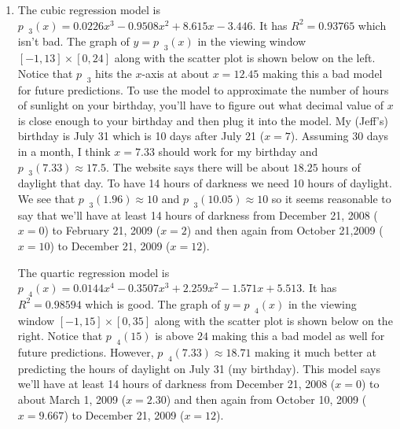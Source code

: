\documentclass{ximera}
\begin{document}
\begin{enumerate}
\setcounter{enumi}{\value{HW}}


\item The cubic regression model is $p_{\mbox{ $3$}}(x) = 0.0226x^{3} - 0.9508x^{2} + 8.615x - 3.446$.  It has $R^{2} = 0.93765$ which isn't bad.  The graph of $y = p_{\mbox{ $3$}}(x)$ in the viewing window $[-1,13] \times [0, 24]$ along with the scatter plot is shown below on the left.  Notice that $p_{\mbox{ $3$}}$ hits the $x$-axis at about $x = 12.45$ making this a bad model for future predictions.  To use the model to approximate the number of hours of sunlight on your birthday, you'll have to figure out what decimal value of $x$ is close enough to your birthday and then plug it into the model.  My (Jeff's) birthday is July 31 which is 10 days after July 21 ($x = 7$).  Assuming 30 days in a month, I think $x = 7.33$ should work for my birthday and $p_{\mbox{ $3$}}(7.33) \approx 17.5$.  The website says there will be about $18.25$ hours of daylight that day.  To have 14 hours of darkness we need 10 hours of daylight.  We see that $p_{\mbox{ $3$}}(1.96) \approx 10$ and $p_{\mbox{ $3$}}(10.05) \approx 10$ so it seems reasonable to say that we'll have at least 14 hours of darkness from December 21, 2008 ($x = 0$) to February 21, 2009 ($x = 2$) and then again from October 21,2009 ($x = 10$) to December 21, 2009 ($x = 12$).

\smallskip

The quartic regression model is $p_{\mbox{ $4$}}(x) = 0.0144x^{4} - 0.3507x^{3} + 2.259x^{2} - 1.571x + 5.513$.  It has $R^{2} = 0.98594$ which is good.  The graph of $y = p_{\mbox{ $4$}}(x)$ in the viewing window $[-1, 15] \times [0, 35]$ along with the scatter plot is shown below on the right.  Notice that $p_{\mbox{ $4$}}(15)$ is above $24$ making this a bad model as well for future predictions.  However, $p_{\mbox{ $4$}}(7.33) \approx 18.71$ making it much better at predicting the hours of daylight on July 31 (my birthday).  This model says we'll have at least 14 hours of darkness from December 21, 2008 ($x = 0$) to about March 1, 2009 ($x = 2.30$) and then again from October 10, 2009 ($x = 9.667$) to December 21, 2009 ($x = 12$).

\begin{center}

\begin{tabular}{cc}



\end{tabular}
\end{center}
\end{enumerate}
\end{document}
